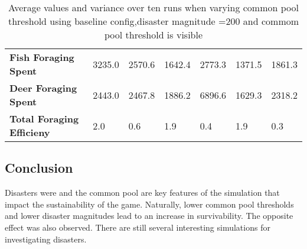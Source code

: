 \begin{center}
\begin{table}[h]
\begin{tabular}{l|ll|ll|ll}
\textbf{Fish Foraging Spent}         & 3235.0                             & 2570.6                                & 1642.4                             & 2773.3                                & 1371.5                             & 1861.3                                \\
\textbf{Deer Foraging Spent}         & 2443.0                             & 2467.8                                & 1886.2                             & 6896.6                                & 1629.3                             & 2318.2                                \\
\textbf{Total Foraging Efficieny}    & 2.0                                & 0.6                                   & 1.9                                & 0.4                                   & 1.9                                & 0.3                                  
\end{tabular}
\caption{Average values and variance over ten runs when varying common pool threshold using baseline config,disaster magnitude =200 and commom pool threshold is visible}
\label{tab:16_results_and_eval:Disasters:Common_pool}
\end{table}
\end{center}

\subsection{Conclusion}
Disasters were and the common pool are key features of the simulation that impact the sustainability of the game. Naturally, lower common pool thresholds and lower disaster magnitudes lead to an increase in survivability. The opposite effect was also observed. There are still several interesting simulations for investigating disasters.
